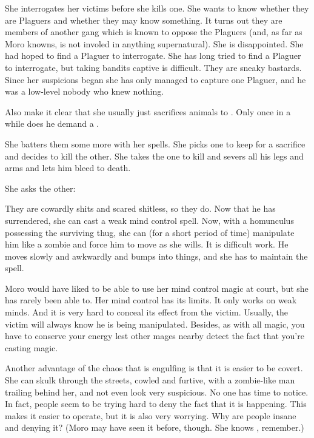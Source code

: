 She interrogates her victims before she kills one.
She wants to know whether they are Plaguers and whether they may know something.
It turns out they are members of another gang which is known to oppose the Plaguers (and, as far as Moro knowns, is not involed in anything supernatural). 
She is disappointed.
She had hoped to find a Plaguer to interrogate.
She has long tried to find a Plaguer to interrogate, but taking bandits captive is difficult. 
They are sneaky bastards.
Since her suspicions began she has only managed to capture one Plaguer, and he was a low-level nobody who knew nothing. 

Also make it clear that she usually just sacrifices animals to \Nasshikerr. 
Only once in a while does he demand a \humanoid.


She batters them some more with her spells.
She picks one to keep for a sacrifice and decides to kill the other.
She takes the one to kill and severs all his legs and arms and lets him bleed to death.

She asks the other: 

They are cowardly shits and scared shitless, so they do.
Now that he has surrendered, she can cast a weak mind control spell.
Now, with a homunculus possessing the surviving thug, she can (for a short period of time) manipulate him like a zombie and force him to move as she wills.
It is difficult work.
He moves slowly and awkwardly and bumps into things, and she has to maintain the spell.

Moro would have liked to be able to use her mind control magic at court, but she has rarely been able to.
Her mind control has its limits. 
It only works on weak minds. 
And it is very hard to conceal its effect from the victim. 
Usually, the victim will always know he is being manipulated. 
Besides, as with all magic, you have to conserve your energy lest other mages nearby detect the fact that you're casting magic. 



\begin{comment}
  \section{Moro's chambers}
\end{comment}
\new



\begin{comment}
  \subsection{Moro gloats}
\end{comment}
Another advantage of the chaos that is engulfing \Malcur is that it is easier to be covert. 
She can skulk through the streets, cowled and furtive, with a zombie-like man trailing behind her, and not even look very suspicious. 
No one has time to notice. 
In fact, people seem to be trying hard to deny the fact that it is happening. 
This makes it easier to operate, but it is also very worrying.
Why are people insane and denying it?
(Moro may have seen it before, though. She knows \Ubloth, remember.)

